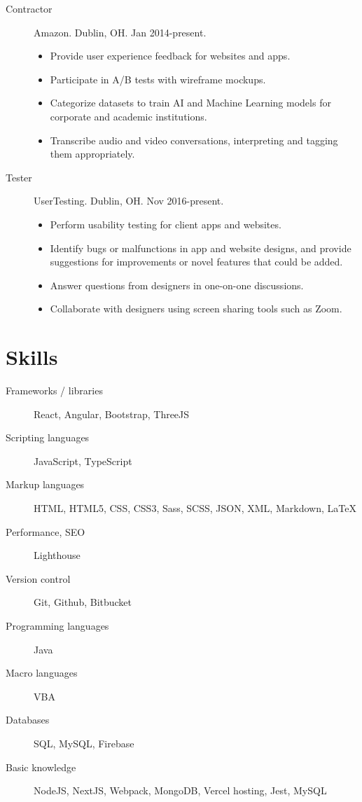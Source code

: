 \documentclass{article}
\begin{document}
\begin{description}
  \item[Contractor] Amazon. Dublin, OH. Jan 2014-present.
  \begin{itemize}
    \item Provide user experience feedback for websites and apps.
    \item Participate in A/B tests with wireframe mockups.
    \item Categorize datasets to train AI and Machine Learning models for corporate and academic institutions.
    \item Transcribe audio and video conversations, interpreting and tagging them appropriately.
  \end{itemize}
  \item[Tester] UserTesting. Dublin, OH. Nov 2016-present.
  \begin{itemize}
    \item Perform usability testing for client apps and websites.
    \item Identify bugs or malfunctions in app and website designs, and provide suggestions for improvements or novel features that could be added.
    \item Answer questions from designers in one-on-one discussions.
    \item Collaborate with designers using screen sharing tools such as Zoom.
  \end{itemize}  
\end{description}

\section{Skills}

\begin{description}
  \item [Frameworks / libraries] React, Angular, Bootstrap, ThreeJS
  \item [Scripting languages] JavaScript, TypeScript
  \item [Markup languages] HTML, HTML5, CSS, CSS3, Sass, SCSS, JSON, XML, Markdown, LaTeX
  \item [Performance, SEO] Lighthouse
  \item [Version control] Git, Github, Bitbucket
  \item [Programming languages] Java
  \item [Macro languages] VBA
  \item [Databases] SQL, MySQL, Firebase
  \item [Basic knowledge] NodeJS, NextJS, Webpack, MongoDB, Vercel hosting, Jest, MySQL
\end{description}
\end{document}
